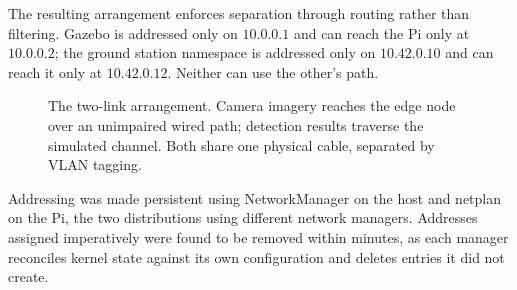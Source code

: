 The resulting arrangement enforces separation through routing rather than
filtering. Gazebo is addressed only on \(10.0.0.1\) and can reach the Pi only at
\(10.0.0.2\); the ground station namespace is addressed only on \(10.42.0.10\)
and can reach it only at \(10.42.0.12\). Neither can use the other's path.

\begin{figure}[htbp]
\centering
{}
\caption{The two-link arrangement. Camera imagery reaches the edge node over an
unimpaired wired path; detection results traverse the simulated channel. Both
share one physical cable, separated by VLAN tagging.}
\label{fig:hitl-architecture}
\end{figure}

Addressing was made persistent using NetworkManager on the host and netplan on
the Pi, the two distributions using different network managers. Addresses
assigned imperatively were found to be removed within minutes, as each manager
reconciles kernel state against its own configuration and deletes entries it did
not create.

